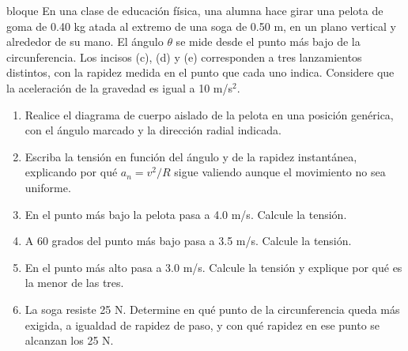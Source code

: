 \documentclass[11pt,openany]{book}
\begin{document}
\begin{ejercicio}{bloque}
En una clase de educación física, una alumna hace girar una pelota de goma de 0.40 kg atada al extremo de una soga de 0.50 m, en un plano vertical y alrededor de su mano. El ángulo $\theta$ se mide desde el punto más bajo de la circunferencia. Los incisos (c), (d) y (e) corresponden a tres lanzamientos distintos, con la rapidez medida en el punto que cada uno indica. Considere que la aceleración de la gravedad es igual a 10 m/s$^2$.
\begin{enumerate}[label=(\alph*), leftmargin=1.7em, itemsep=1pt, topsep=3pt]
  \item Realice el diagrama de cuerpo aislado de la pelota en una posición genérica, con el ángulo marcado y la dirección radial indicada.
  \item Escriba la tensión en función del ángulo y de la rapidez instantánea, explicando por qué $a_n = v^2/R$ sigue valiendo aunque el movimiento no sea uniforme.
  \item En el punto más bajo la pelota pasa a 4.0 m/s. Calcule la tensión.
  \item A 60 grados del punto más bajo pasa a 3.5 m/s. Calcule la tensión.
  \item En el punto más alto pasa a 3.0 m/s. Calcule la tensión y explique por qué es la menor de las tres.
  \item La soga resiste 25 N. Determine en qué punto de la circunferencia queda más exigida, a igualdad de rapidez de paso, y con qué rapidez en ese punto se alcanzan los 25 N.
\end{enumerate}
\end{ejercicio}
\end{document}
